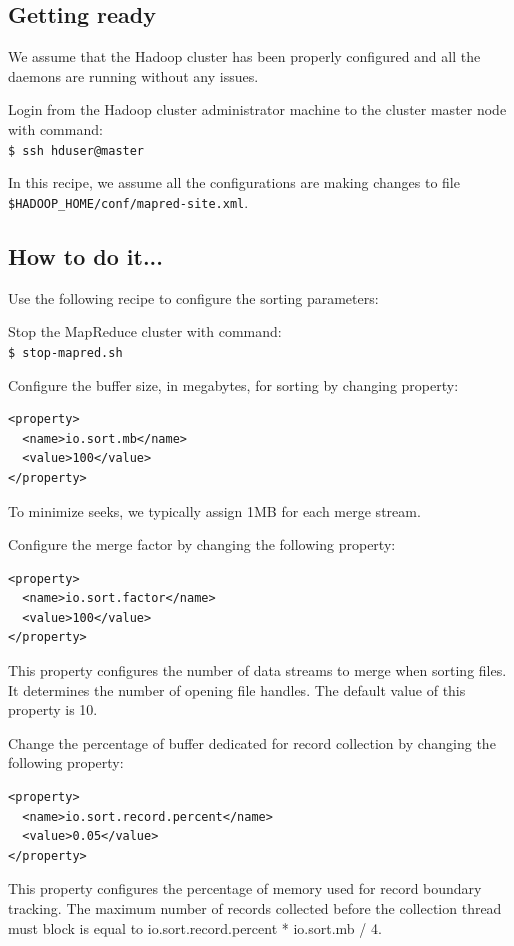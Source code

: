 \subsection*{Getting ready}
We assume that the Hadoop cluster has been properly configured and all the daemons are running without any issues.

Login from the Hadoop cluster administrator machine to the cluster master node with command: \\
\verb|$ ssh hduser@master|

In this recipe, we assume all the configurations are making changes to file \verb|$HADOOP_HOME/conf/mapred-site.xml|.
\subsection*{How to do it...}
Use the following recipe to configure the sorting parameters:

Stop the MapReduce cluster with command: \\
\verb|$ stop-mapred.sh|

Configure the buffer size, in megabytes, for sorting by changing property:
\lstset{style=bashstyle}
\begin{lstlisting}
<property>
  <name>io.sort.mb</name>
  <value>100</value>
</property>
\end{lstlisting}

To minimize seeks, we typically assign 1MB for each merge stream.

Configure the merge factor by changing the following property:
\lstset{style=bashstyle}
\begin{lstlisting}
<property>
  <name>io.sort.factor</name>
  <value>100</value>
</property>
\end{lstlisting}

This property configures the number of data streams to merge when sorting files. It determines the number of opening file handles. The default value of this property is 10.

Change the percentage of buffer dedicated for record collection by changing the following property:
\lstset{style=bashstyle}
\begin{lstlisting}
<property>
  <name>io.sort.record.percent</name>
  <value>0.05</value>
</property>
\end{lstlisting}
This property configures the percentage of memory used for record boundary tracking.  The maximum number of records collected before the collection thread must block is equal to io.sort.record.percent * io.sort.mb / 4.

